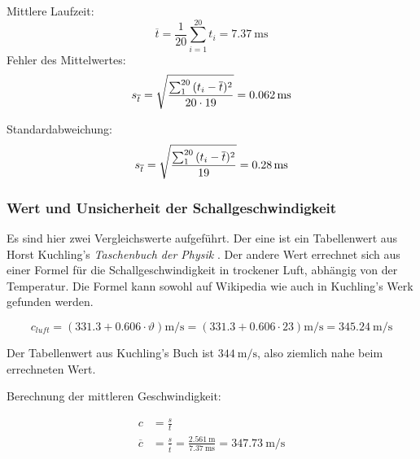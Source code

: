 Mittlere Laufzeit:
\begin{equation*}
    \overline{t} = \frac{1}{20} \sum_{i=1}^{20} t_i = \SI{7.37}{\milli\second}
\end{equation*}
Fehler des Mittelwertes:
\begin{equation*}
    s_{\overline{t}} = \sqrt{ \frac{\sum_{1}^{20}{(t_i-\overline{t})^2}}{20 \cdot 19}} = \SI{0.062}{\milli\second} \\
\end{equation*}

Standardabweichung:
\begin{equation*}
    s_{\overline{t}} = \sqrt{ \frac{\sum_{1}^{20}{(t_i-\overline{t})^2}}{19}} = \SI{0.28}{\milli\second} \\
\end{equation*}


\subsubsection{Wert und Unsicherheit der Schallgeschwindigkeit}

Es   sind   hier  zwei   Vergleichswerte   aufgef\"uhrt. Der   eine  ist   ein
Tabellenwert    aus   Horst    Kuchling's   \emph{Taschenbuch    der   Physik}
\cite{ref:kuchling:speedOfSoundTable}.    Der  andere   Wert  errechnet   sich
aus   einer    Formel   f\"ur    die   Schallgeschwindigkeit    in   trockener
Luft,   abh\"angig   von  der   Temperatur.  Die   Formel   kann  sowohl   auf
Wikipedia  \cite{ref:wikipedia:speedOfSound}  wie   auch  in  Kuchling's  Werk
\cite{ref:kuchling:speedOfSoundFormula} gefunden werden.

\begin{equation*}
    c_{luft} = (331.3 + 0.606 \cdot \vartheta) \si{\meter\per\second} = (331.3 + 0.606 \cdot 23) \si{\meter\per\second} = \SI{345.24}{\meter\per\second}
\end{equation*}

Der Tabellenwert  aus Kuchling's Buch ist  $\SI{344}{\meter\per\second}$, also
ziemlich nahe beim errechneten Wert.


Berechnung der mittleren Geschwindigkeit:

\begin{align*}
    c            & = \frac{s}{t} \\
    \overline{c} & = \frac{s}{\overline{t}} = \frac{\SI{2.561}{\meter}}{\SI{7.37}{\milli\second}} = \SI{347.73}{\meter\per\second} \\
\end{align*}

